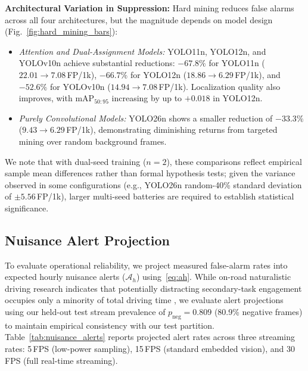 \documentclass[conference]{IEEEtran}
\begin{document}
\textbf{Architectural Variation in Suppression:} Hard mining reduces false alarms across all four architectures, but the magnitude depends on model design (Fig.~\ref{fig:hard_mining_bars}):
\begin{itemize}
    \item \textit{Attention and Dual-Assignment Models:} YOLO11n, YOLO12n, and YOLOv10n achieve substantial reductions: $-67.8\%$ for YOLO11n ($22.01 \to 7.08$\,FP/1k), $-66.7\%$ for YOLO12n ($18.86 \to 6.29$\,FP/1k), and $-52.6\%$ for YOLOv10n ($14.94 \to 7.08$\,FP/1k). Localization quality also improves, with $\text{mAP}_{50:95}$ increasing by up to $+0.018$ in YOLO12n.
    \item \textit{Purely Convolutional Models:} YOLO26n shows a smaller reduction of $-33.3\%$ ($9.43 \to 6.29$\,FP/1k), demonstrating diminishing returns from targeted mining over random background frames.
\end{itemize}
We note that with dual-seed training ($n=2$), these comparisons reflect empirical sample mean differences rather than formal hypothesis tests; given the variance observed in some configurations (e.g., YOLO26n random-40\% standard deviation of $\pm 5.56$\,FP/1k), larger multi-seed batteries are required to establish statistical significance.


\subsection{Nuisance Alert Projection} \label{subsec:results_nuisance} To evaluate operational reliability, we project measured false-alarm rates into expected hourly nuisance alerts ($\mathcal{A}_h$) using~\eqref{eq:ah}. While on-road naturalistic driving research indicates that potentially distracting secondary-task engagement occupies only a minority of total driving time \cite{stutts2005}, we evaluate alert projections using our held-out test stream prevalence of $p_{\mathrm{neg}} = 0.809$ (80.9\% negative frames) to maintain empirical consistency with our test partition. Table~\ref{tab:nuisance_alerts} reports projected alert rates across three streaming rates: 5\,FPS (low-power sampling), 15\,FPS (standard embedded vision), and 30\,FPS (full real-time streaming).
\end{document}
